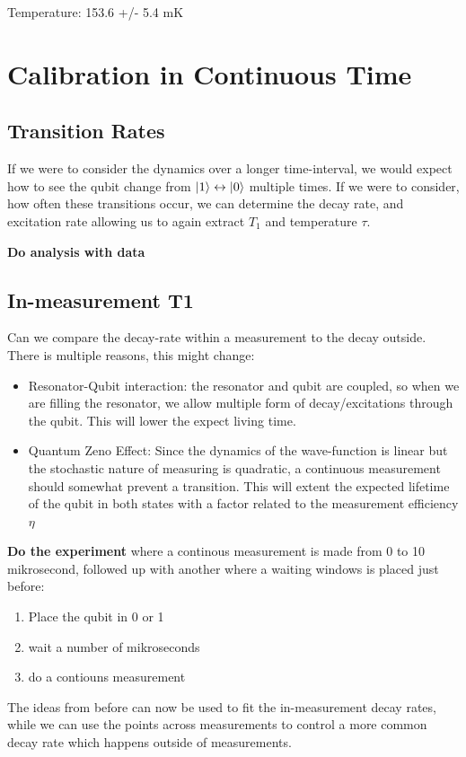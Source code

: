 Temperature: 	 153.6 +/- 5.4 mK

\section{Calibration in Continuous Time}

\subsection{Transition Rates}
If we were to consider the dynamics over a longer time-interval, we would expect how to see the qubit change from $\ket{1} \leftrightarrow \ket{0}$ multiple times. If we were to consider, how often these transitions occur, we can determine the decay rate, and excitation rate allowing us to again extract $T_1$ and temperature $\tau$.

\textbf{Do analysis with data}



\subsection{In-measurement T1 }
Can we compare the decay-rate within a measurement to the decay outside. There is multiple reasons, this might change:
\begin{itemize}
    \item Resonator-Qubit interaction: the resonator and qubit are coupled, so when we are filling the resonator, we allow multiple form of decay/excitations through the qubit. This will lower the expect living time.
    \item Quantum Zeno Effect: Since the dynamics of the wave-function is linear but the stochastic nature of measuring is quadratic, a continuous measurement should somewhat prevent a transition. This will extent the expected lifetime of the qubit in both states with a factor related to the measurement efficiency $\eta$
\end{itemize}

\textbf{Do the experiment} where a continous measurement is made from 0 to 10 mikrosecond, followed up with another where a waiting windows is placed just before:
\begin{enumerate}
    \item Place the qubit in 0 or 1
    \item wait a number of mikroseconds
    \item do a contiouns measurement
\end{enumerate}
The ideas from before can now be used to fit the in-measurement decay rates, while we can use the points across measurements to control a more common decay rate which happens outside of measurements.